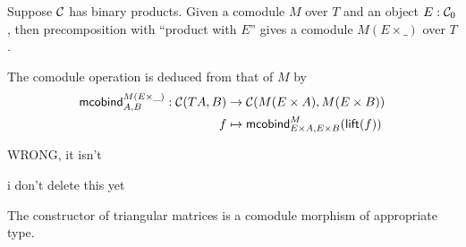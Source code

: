 \documentclass{amsart}
\begin{document}
\begin{definition}
 Suppose ${\mathcal{C}}$ has binary products.
 Given a comodule $M$ over $T$ and an object $E:{\mathcal{C}}_0$, then precomposition with \enquote{product with $E$}
 gives a comodule $M(E\times\_)$ over $T$.
 
 The comodule operation is deduced from that of $M$ by 
 \begin{align*} \mathsf{mcobind}^{M(E\times\_)}_{A,B} : {\mathcal{C}}(TA,B)&\to {\mathcal{C}}(M(E\times A), M(E\times B)) \\
                                                      f &\mapsto \mathsf{mcobind}^M_{E\times A,E\times B}(\mathsf{lift}(f))
  \end{align*}                                        
 
 
\end{definition}

\begin{definition}

  WRONG, it isn't 
  
  i don't delete this yet

 
 
\end{definition}


\begin{definition}
\end{definition}


\begin{example}
 The constructor of triangular matrices is a comodule morphism of appropriate type.
\end{example}


\end{document}
